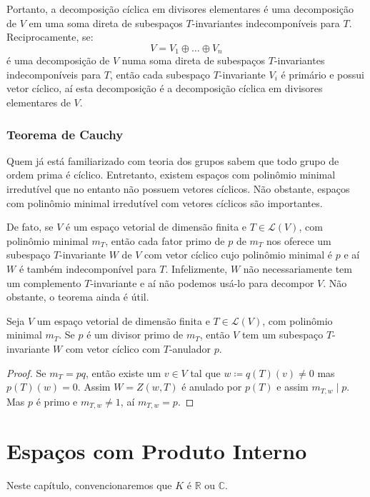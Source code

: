 \documentclass[11pt,twoside,a4paper]{book}
\begin{document}
\noindent
Portanto, a decomposição cíclica em divisores elementares é uma decomposição de $V$ em uma soma direta de subespaços $T$-invariantes indecomponíveis para $T$. Reciprocamente, se:
\[
V=V_1\oplus\dots\oplus V_n
\]
é uma decomposição de $V$ numa soma direta de subespaços $T$-invariantes indecomponíveis para $T$, então cada subespaço $T$-invariante $V_i$ é primário e possui vetor cíclico, aí esta decomposição é a decomposição cíclica em divisores elementares de $V$.

\subsection{Teorema de Cauchy}

Quem já está familiarizado com teoria dos grupos sabem que todo grupo de ordem prima é cíclico. Entretanto, existem espaços com polinômio minimal irredutível que no entanto não possuem vetores cíclicos. Não obstante, espaços com polinômio minimal irredutível com vetores cíclicos são importantes.

\medskip
\noindent
De fato, se $V$ é um espaço vetorial de dimensão finita e $T\in\mathcal{L}(V)$, com polinômio minimal $m_T$, então cada fator primo de $p$ de $m_T$ nos oferece um subespaço $T$-invariante $W$ de $V$ com vetor cíclico cujo polinômio minimal é $p$ e aí $W$ é também indecomponível para $T$.
Infelizmente, $W$ não necessariamente tem um complemento $T$-invariante e aí não podemos usá-lo
para decompor $V$. Não obstante, o teorema ainda é útil.

\begin{teorema}
Seja $V$ um espaço vetorial de dimensão finita e $T\in\mathcal{L}(V)$, com polinômio minimal $m_T$. Se $p$ é um divisor primo de $m_T$, então $V$ tem um subespaço $T$-invariante $W$ com vetor cíclico com $T$-anulador $p$.
\end{teorema}
\begin{proof}
Se $m_T=pq$, então existe um $v\in V$ tal que $w\coloneqq q(T)(v)\neq 0$ mas $p(T)(w)=0$.
Assim $W=Z(w,T)$ é anulado por $p(T)$ e assim $m_{T,w}\mid p$. Mas $p$ é primo e
$m_{T,w}\neq 1$, aí $m_{T,w}=p$.
\end{proof}

\chapter{Espaços com Produto Interno}

Neste capítulo, convencionaremos que $K$ é $\mathbb{R}$ ou $\mathbb{C}$.
\end{document}
